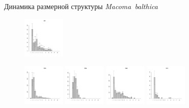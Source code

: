 \documentclass{beamer}
\begin{document}
\begin{frame}{Динамика размерной структуры {\it Macoma~balthica}}
\begin{figure}[h]
\includegraphics[width=20mm]{../White_Sea/Ryashkov_YuG/YuG_2011_.pdf}
\end{figure}
\begin{figure}[h]
\includegraphics[width=20mm]{../White_Sea/Ryashkov_YuG/YuG_2003_.pdf}
\includegraphics[width=20mm]{../White_Sea/Ryashkov_YuG/YuG_2006_.pdf}
\includegraphics[width=20mm]{../White_Sea/Ryashkov_YuG/YuG_2009_.pdf}
\includegraphics[width=20mm]{../White_Sea/Ryashkov_YuG/YuG_2012_.pdf}
\end{figure}
\end{frame}
\end{document}
